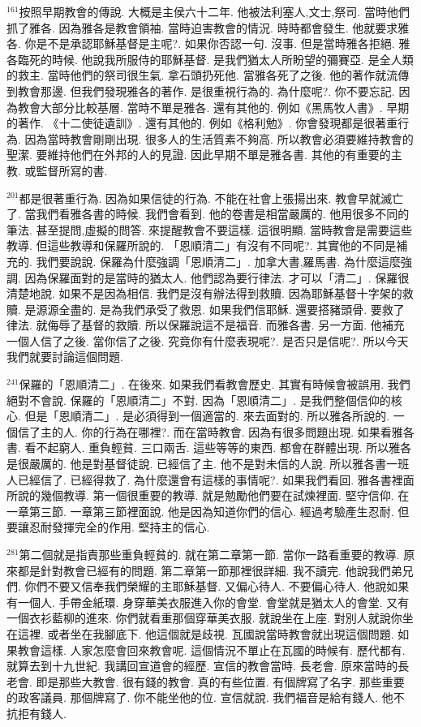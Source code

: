 \documentclass{book}
\begin{document}
$^{161}$按照早期教會的傳說.
大概是主侯六十二年.
他被法利塞人,文士,祭司.
當時他們抓了雅各.
因為雅各是教會領袖.
當時迫害教會的情況.
時時都會發生.
他就要求雅各.
你是不是承認耶穌基督是主呢?.
如果你否認一句.
沒事.
但是當時雅各拒絕.
雅各臨死的時候.
他說我所服侍的耶穌基督.
是我們猶太人所盼望的彌賽亞.
是全人類的救主.
當時他們的祭司很生氣.
拿石頭扔死他.
當雅各死了之後.
他的著作就流傳到教會那邊.
但我們發現雅各的著作.
是很重視行為的.
為什麼呢?.
你不要忘記.
因為教會大部分比較基層.
當時不單是雅各.
還有其他的.
例如《黑馬牧人書》.
早期的著作.
《十二使徒遺訓》.
還有其他的.
例如《格利勉》.
你會發現都是很著重行為.
因為當時教會剛剛出現.
很多人的生活質素不夠高.
所以教會必須要維持教會的聖潔.
要維持他們在外邦的人的見證.
因此早期不單是雅各書.
其他的有重要的主教.
或監督所寫的書.

$^{201}$都是很著重行為.
因為如果信徒的行為.
不能在社會上張揚出來.
教會早就滅亡了.
當我們看雅各書的時候.
我們會看到.
他的卷書是相當嚴厲的.
他用很多不同的筆法.
甚至提問,虛擬的問答.
來提醒教會不要這樣.
這很明顯.
當時教會是需要這些教導.
但這些教導和保羅所說的.
「恩順清二」有沒有不同呢?.
其實他的不同是補充的.
我們要說說.
保羅為什麼強調「恩順清二」.
加拿大書,羅馬書.
為什麼這麼強調.
因為保羅面對的是當時的猶太人.
他們認為要行律法.
才可以「清二」.
保羅很清楚地說.
如果不是因為相信.
我們是沒有辦法得到救贖.
因為耶穌基督十字架的救贖.
是源源全盡的.
是為我們承受了救恩.
如果我們信耶穌.
還要搭豬頭骨.
要救了律法.
就侮辱了基督的救贖.
所以保羅說這不是福音.
而雅各書.
另一方面.
他補充一個人信了之後.
當你信了之後.
究竟你有什麼表現呢?.
是否只是信呢?.
所以今天我們就要討論這個問題.

$^{241}$保羅的「恩順清二」.
在後來.
如果我們看教會歷史.
其實有時候會被誤用.
我們絕對不會說.
保羅的「恩順清二」不對.
因為「恩順清二」.
是我們整個信仰的核心.
但是「恩順清二」.
是必須得到一個適當的.
來去面對的.
所以雅各所說的.
一個信了主的人.
你的行為在哪裡?.
而在當時教會.
因為有很多問題出現.
如果看雅各書.
看不起窮人.
重負輕貧.
三口兩舌.
這些等等的東西.
都會在群體出現.
所以雅各是很嚴厲的.
他是對基督徒說.
已經信了主.
他不是對未信的人說.
所以雅各書一班人已經信了.
已經得救了.
為什麼還會有這樣的事情呢?.
如果我們看回.
雅各書裡面所說的幾個教導.
第一個很重要的教導.
就是勉勵他們要在試煉裡面.
堅守信仰.
在一章第三節.
一章第三節裡面說.
他是因為知道你們的信心.
經過考驗產生忍耐.
但要讓忍耐發揮完全的作用.
堅持主的信心.

$^{281}$第二個就是指責那些重負輕貧的.
就在第二章第一節.
當你一路看重要的教導.
原來都是針對教會已經有的問題.
第二章第一節那裡很詳細.
我不讀完.
他說我們弟兄們.
你們不要又信奉我們榮耀的主耶穌基督.
又偏心待人.
不要偏心待人.
他說如果有一個人.
手帶金紙環.
身穿華美衣服進入你的會堂.
會堂就是猶太人的會堂.
又有一個衣衫藍柳的進來.
你們就看重那個穿華美衣服.
就說坐在上座.
對別人就說你坐在這裡.
或者坐在我腳底下.
他這個就是歧視.
瓦國說當時教會就出現這個問題.
如果教會這樣.
人家怎麼會回來教會呢.
這個情況不單止在瓦國的時候有.
歷代都有.
就算去到十九世紀.
我講回宣道會的經歷.
宣信的教會當時.
長老會.
原來當時的長老會.
即是那些大教會.
很有錢的教會.
真的有些位置.
有個牌寫了名字.
那些重要的政客議員.
那個牌寫了.
你不能坐他的位.
宣信就說.
我們福音是給有錢人.
他不抗拒有錢人.
\end{document}
